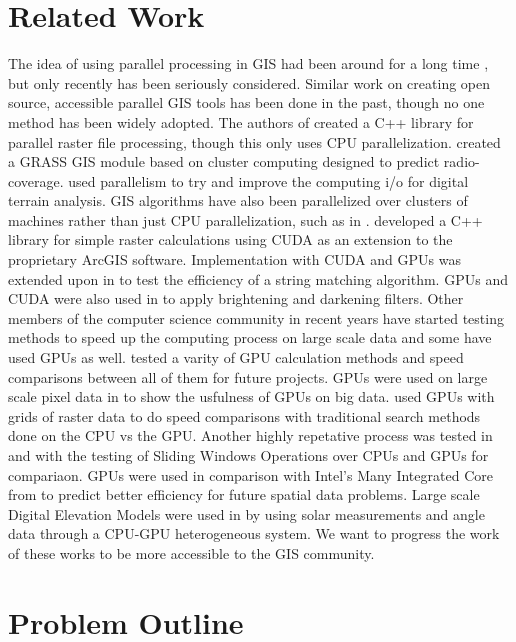 \documentclass[journal]{IEEEtran}
\begin{document}
\section{Related Work} \label{related}
The idea of using parallel processing in GIS had been around for a long time
\cite{healy}, but only recently has been seriously considered.  Similar work on
creating open source, accessible parallel GIS tools has been done in the past,
though no one method has been widely adopted. The authors of \cite{guan}
created a C++ library for parallel raster file processing, though this only
uses CPU parallelization. \cite{benedicic} created a GRASS GIS module based on
cluster computing designed to predict radio-coverage. \cite{Cheng} used 
parallelism to try and improve the computing i/o for digital terrain analysis.
GIS algorithms have also been parallelized over clusters of machines rather
than just CPU parallelization, such as in \cite{huang}.  \cite{hpc_cuda} 
developed a C++ library for simple raster calculations using CUDA as an 
extension to the proprietary ArcGIS software. Implementation with CUDA and
GPUs was extended upon in \cite{Xu} to test the efficiency of a string
matching algorithm. GPUs and CUDA were also used in \cite{Saha} to apply
brightening and darkening filters. Other members of the computer science 
community in recent years have started testing methods to speed up the 
computing process on large scale data and some have used GPUs as well. 
\cite{Gaurav} tested a varity of GPU calculation methods and speed comparisons 
between all of them for future projects. GPUs were used on large scale pixel 
data in \cite{Wadbro} to show the usfulness of GPUs on big data. \cite{Zhang} 
used GPUs with grids of raster data to do speed comparisons with 
traditional search methods done on the CPU vs the GPU. Another highly 
repetative process was tested in \cite{Yang} and \cite{Martínez-Frutos} 
with the testing of Sliding Windows Operations over CPUs and GPUs for 
compariaon. GPUs were used in comparison with Intel's Many Integrated Core
from \cite{Shi} to predict better efficiency for future spatial data 
problems. Large scale Digital Elevation Models were used in \cite{Tabik} by 
using solar measurements and angle data through a CPU-GPU heterogeneous 
system. We want to progress the work of these works to be more accessible 
to the GIS community.

\section{Problem Outline} \label{problem}
\end{document}
